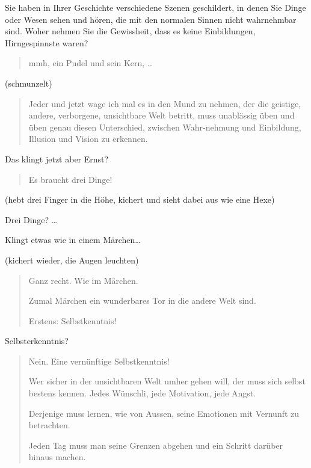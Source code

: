 \documentclass[10pt,titlepage,a5paper]{book}
\newenvironment{tg}{\begin{quote}\em}{\end{quote}}
\begin{document}
Sie haben in Ihrer Geschichte verschiedene Szenen geschildert, in denen Sie Dinge oder Wesen sehen und hören, die mit den normalen Sinnen nicht wahrnehmbar sind. Woher nehmen Sie die Gewissheit, dass es keine Einbildungen, Hirngespinnste waren?

\begin{tg}

mmh, ein Pudel und sein Kern, \dots 

\end{tg}

(schmunzelt)

\begin{tg}


Jeder und jetzt wage ich mal es in den Mund zu nehmen, der die geistige, andere, verborgene, unsichtbare Welt betritt, muss unablässig üben und üben genau diesen Unterschied, zwischen Wahr-nehmung und Einbildung, Illusion und Vision zu erkennen. 

\end{tg}


Das klingt jetzt aber Ernst?

\begin{tg}

Es braucht drei Dinge!

\end{tg}

(hebt drei Finger in die Höhe, kichert und sieht dabei aus wie eine Hexe)

Drei Dinge? \dots

Klingt etwas wie in einem Märchen\dots 

(kichert wieder, die Augen leuchten)

\begin{tg}

Ganz recht. Wie im Märchen.

Zumal Märchen ein wunderbares Tor in die andere Welt sind.

Erstens: Selbstkenntnis!

\end{tg}

Selbsterkenntnis?

\begin{tg}

Nein. Eine vernünftige Selbstkenntnis!

Wer sicher in der unsichtbaren Welt umher gehen will, der muss sich selbst bestens kennen. Jedes Wünschli, jede Motivation, jede Angst. 

Derjenige muss lernen, wie von Aussen, seine Emotionen mit Vernunft zu betrachten.

Jeden Tag muss man seine Grenzen abgehen und ein Schritt darüber hinaus machen.

\end{tg}  
\end{document}
